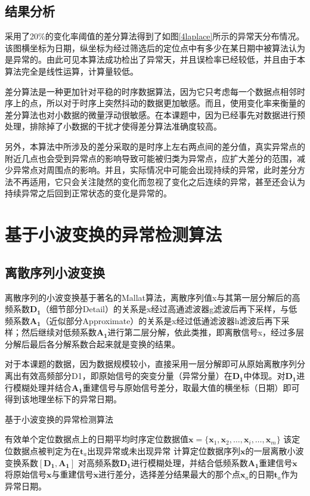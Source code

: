 \documentclass[a4paper,AutoFakeBold,oneside,12pt]{book}
\begin{document}
\subsection{结果分析}
	采用了20\%的变化率阈值的差分算法得到了如图\ref{4laplace}所示的异常天分布情况。该图横坐标为日期，纵坐标为经过筛选后的定位点中有多少在某日期中被算法认为是异常的。由此可见本算法成功检出了异常天，并且误检率已经较低，并且由于本算法完全是线性运算，计算量较低。


	差分算法是一种更加针对平稳的时序数据算法，因为它只考虑每一个数据点相邻时序上的点，所以对于时序上突然抖动的数据更加敏感。而且，使用变化率来衡量的差分算法也对小数据的微量浮动很敏感。在本课题中，因为已经事先对数据进行预处理，排除掉了小数据的干扰才使得差分算法准确度较高。

	另外，本算法中所涉及的差分采取的是时序上左右两点间的差分值，真实异常点的附近几点也会受到异常点的影响导致可能被归类为异常点，应扩大差分的范围，减少异常点对周围点的影响。并且，实际情况中可能会出现持续的异常，此时差分方法不再适用，它只会关注陡然的变化而忽视了变化之后连续的异常，甚至还会认为持续异常之后回到正常状态的变化是异常的。

\section{基于小波变换的异常检测算法}
\subsection{离散序列小波变换}
	离散序列的小波变换基于著名的Mallat算法，离散序列值x与其第一层分解后的高频系数$\bm{D_1}$（细节部分Detail）的关系是x经过高通滤波器g滤波后再下采样，与低频系数$\bm{A_1}$（近似部分Approximate）的关系是x经过低通滤波器h滤波后再下采样；然后继续对低频系数$\bm{A_1}$进行第二层分解，依此类推，即离散信号x，经过多层分解后最后各分解系数合起来就是变换的结果。

	对于本课题的数据，因为数据规模较小，直接采用一层分解即可从原始离散序列分离出有效高频部分D1，即原始信号的突变分量（异常分量）在$\bm{D_1}$中体现。对$\bm{D_1}$进行模糊处理并结合$\bm{A_1}$重建信号与原始信号差分，取最大值的横坐标（日期）即可得到该地理坐标下的异常日期。

\begin{algorithm} 
\caption{基于小波变换的异常检测算法} 
\label{a43}
\renewcommand{\algorithmicrequire}{\textbf{输入：}}
\renewcommand{\algorithmicensure}{\textbf{输出：}} 
\begin{algorithmic}[1] 
\Require 有效单个定位数据点上的日期平均时序定位数据值$\bm{x}=\{\bm{x}_1,\bm{x}_2,\ldots,\bm{x}_i,\ldots,\bm{x}_m\}$
\Ensure 该定位数据点被判定为在$\bm{t}_a$出现异常或未出现异常
\State  计算定位数据序列$\bm{x}$的一层离散小波变换系数$[\bm{D_1},\bm{A_1}]$
\State  对高频系数$\bm{D_1}$进行模糊处理，并结合低频系数$\bm{A_1}$重建信号$\bm{\dot{x}}$
\State 将原始信号$\bm{x}$与重建信号$\bm{\dot{x}}$进行差分，选择差分结果最大的那个点$\bm{x}_a$的日期$\bm{t}_a$作为异常日期。
\end{algorithmic}  
\end{algorithm}
\end{document}
